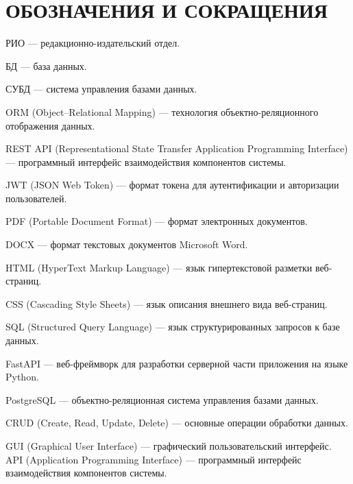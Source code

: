 \section*{ОБОЗНАЧЕНИЯ И СОКРАЩЕНИЯ}

РИО — редакционно-издательский отдел.

БД — база данных.

СУБД — система управления базами данных.

ORM (Object--Relational Mapping) — технология объектно-реляционного отображения данных.

REST API (Representational State Transfer Application Programming Interface) — программный интерфейс взаимодействия компонентов системы.

JWT (JSON Web Token) — формат токена для аутентификации и авторизации пользователей.

PDF (Portable Document Format) — формат электронных документов.

DOCX — формат текстовых документов Microsoft Word.

HTML (HyperText Markup Language) — язык гипертекстовой разметки веб-страниц.

CSS (Cascading Style Sheets) — язык описания внешнего вида веб-страниц.

SQL (Structured Query Language) — язык структурированных запросов к базе данных.

FastAPI — веб-фреймворк для разработки серверной части приложения на языке Python.

PostgreSQL — объектно-реляционная система управления базами данных.

CRUD (Create, Read, Update, Delete) — основные операции обработки данных.

GUI (Graphical User Interface) — графический пользовательский интерфейс.
API (Application Programming Interface) — программный интерфейс взаимодействия компонентов системы.

